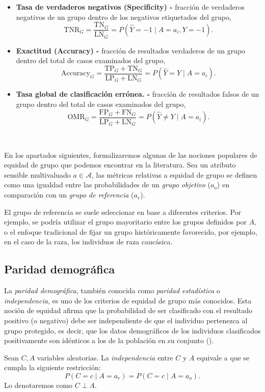 \documentclass[oneside,openright,titlepage,numbers=noenddot,openany,headinclude,footinclude=true,
cleardoublepage=empty,abstractoff,BCOR=5mm,paper=a4,fontsize=12pt,main=spanish]{scrreprt}
\begin{document}
\begin{itemize}
    \item \textbf{Tasa de verdaderos negativos (Specificity) -} fracción de verdaderos negativos de un grupo dentro de los negativos etiquetados del grupo, $$\text{TNR}_G = \frac{\text{TN}_G}{\text{LN}_G} = P(\hat{Y}=-1 \mid A=a_i,Y=-1).$$
    \item \textbf{Exactitud (Accuracy) -} fracción de resultados verdaderos de un grupo dentro del total de casos examinados del grupo, $$\text{Accuracy}_G = \frac{\text{TP}_G+\text{TN}_G}{\text{LP}_G+\text{LN}_G} = P(\hat{Y}=Y \mid A=a_i).$$
    \item \textbf{Tasa global de clasificación errónea. -} fracción de resultados falsos de un grupo dentro del total de casos examinados del grupo, $$\text{OMR}_G = \frac{\text{FP}_G+\text{FN}_G}{\text{LP}_G+\text{LN}_G} = P(\hat{Y}\neq Y \mid A=a_i).$$
\end{itemize}\

En los apartados siguientes, formalizaremos algunas de las nociones populares de equidad de grupo que podemos encontrar en la literatura. Sea un atributo sensible multivaluado $a\in \mathcal{A}$, las métricas relativas a equidad de grupo se definen como una igualdad entre las probabilidades de un \textit{grupo objetivo} ($a_o$) en comparación con un \textit{grupo de referencia} ($a_r$).

El grupo de referencia se suele seleccionar en base a diferentes criterios. Por ejemplo, se podría utilizar el grupo mayoritario entre los grupos definidos por $A$, o el enfoque
tradicional de fijar un grupo históricamente favorecido, por ejemplo, en el caso de la raza, los individuos de raza caucásica.


\subsection{Paridad demográfica}

La \textit{paridad demográfica}, también conocida como \textit{paridad estadística} o \textit{independencia}, es uno de los criterios de equidad de grupo más conocidos. Esta noción de equidad afirma que la probabilidad de ser clasificado con el resultado positivo (o negativo) debe ser independiente de que el individuo pertenezca al grupo protegido, es decir, que los datos demográficos de los individuos clasificados positivamente son idénticos a los de la población en su conjunto (\cite{detect2012}).\\

\begin{definition}
Sean $C,A$ variables aleatorias. La \textit{independencia} entre $C$ y $A$ equivale a que se cumpla la siguiente restricción:
$$P(C=c \mid A=a_r)=P(C=c \mid A=a_o).$$
Lo denotaremos como $C \perp A.$
\end{definition}\
\end{document}
